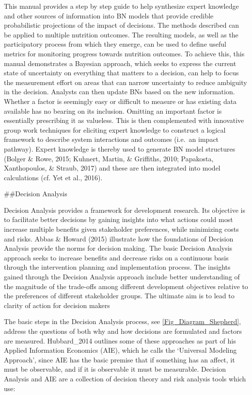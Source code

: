 \documentclass[
]{article}
\begin{document}
This manual provides a step by step guide to help synthesize expert
knowledge and other sources of information into BN models that provide
credible probabilistic projections of the impact of decisions. The
methods described can be applied to multiple nutrition outcomes. The
resulting models, as well as the participatory process from which they
emerge, can be used to define useful metrics for monitoring progress
towards nutrition outcomes. To achieve this, this manual demonstrates a
Bayesian approach, which seeks to express the current state of
uncertainty on everything that matters to a decision, can help to focus
the measurement effort on areas that can narrow uncertainty to reduce
ambiguity in the decision. Analysts can then update BNs based on the new
information. Whether a factor is seemingly easy or difficult to measure
or has existing data available has no bearing on its inclusion. Omitting
an important factor is essentially prescribing it as valueless. This is
then complemented with innovative group work techniques for eliciting
expert knowledge to construct a logical framework to describe system
interactions and outcomes (i.e.~an impact pathway). Expert knowledge is
thereby used to generate BN model structures (Bolger \& Rowe, 2015;
Kuhnert, Martin, \& Griffiths, 2010; Papakosta, Xanthopoulos, \& Straub,
2017) and these are then integrated into model calculations (cf. Yet et
al., 2016).

\#\#Decision Analysis

Decision Analysis provides a framework for development research. Its
objective is to facilitate better decisions by gaining insights into
what actions could most increase multiple benefits given stakeholder
preferences, while minimizing costs and risks. Abbas \& Howard (2015)
illustrate how the foundations of Decision Analysis provide the norms
for decision making. The basic Decision Analysis approach seeks to
increase benefits and decrease risks on a continuous basis through the
intervention planning and implementation process. The insights gained
through the Decision Analysis approach include better understanding of
the magnitude of the trade-offs among different development objectives
relative to the preferences of different stakeholder groups. The
ultimate aim is to lead to clarity of action for decision makers

The basic steps in the Decision Analysis process, see
\autoref{Fig_Diagram_Shepherd}, address the questions of both why and
how decisions are formulated and factors are measured. Hubbard\_2014
outlines some of these approaches as part of his Applied Information
Economics (AIE), which he calls the `Universal Modeling Approach', since
AIE has the basic premise that if something has an affect, it must be
observable, and if it is observable it must be measurable. Decision
Analysis and AIE are a collection of decision theory and risk analysis
tools which use:
\end{document}
